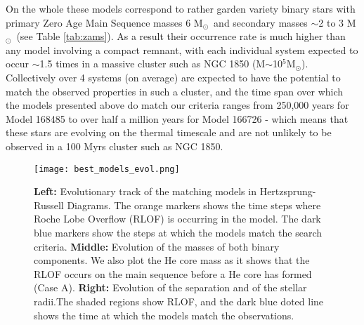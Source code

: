 \documentclass[fleqn,usenatbib]{mnras}
\newcommand{\msol} {M$_{\odot}$}
\newcommand{\about} {$\sim$}
\begin{document}
On the whole these models correspond to rather garden variety binary stars with primary Zero Age Main Sequence masses 6 \msol\, and secondary masses \about 2 to 3 \msol\, (see Table \ref{tab:zams}).
As a result their occurrence rate is much higher than any model involving a compact remnant, with each individual system expected to occur \about1.5 times in a massive cluster such as NGC 1850 (M\about 10$^5$\msol). Collectively over 4 systems (on average) are expected to have the potential to match the observed properties in such a cluster, and the time span over which the models presented above do match our criteria ranges from 250,000 years for Model 168485 to over half a million years for Model 166726 - which means that these stars are evolving on the thermal timescale and are not unlikely to be observed in a 100 Myrs cluster such as NGC 1850.

\begin{figure*}
    \centering
    \texttt{[image: best\_models\_evol.png]}
    \caption{\textbf{Left:} Evolutionary track of the matching models in Hertzsprung-Russell Diagrams. The orange markers shows the time steps where Roche Lobe Overflow (RLOF) is occurring in the model. The dark blue markers show the steps at which the models match the search criteria. \textbf{Middle:} Evolution of the masses of both binary components. We also plot the He core mass as it shows that the RLOF occurs on the main sequence before a He core has formed (Case A). \textbf{Right:} Evolution of the separation and of the stellar radii.The shaded regions show RLOF, and the dark blue doted line shows the time at which the models match the observations.  }
    \label{fig:evolution}
\end{figure*}
\end{document}
